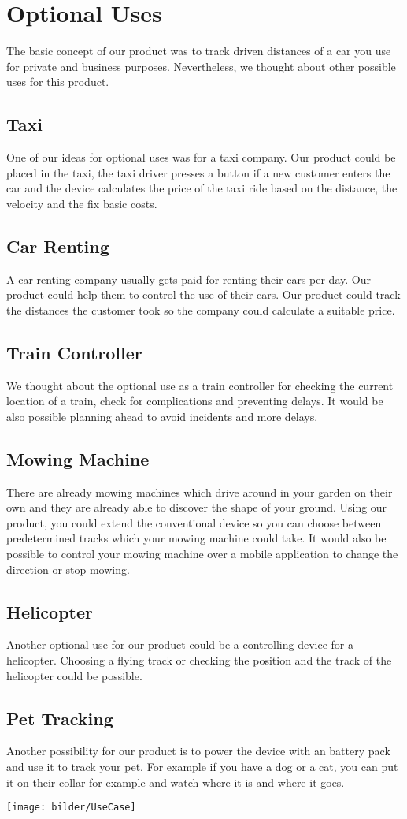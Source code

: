 \chapter{Optional Uses}
The basic concept of our product was to track driven distances of a car you use for private and business purposes. Nevertheless, we thought about other possible uses for this product.
\section{Taxi}
One of our ideas for optional uses was for a taxi company. Our product could be placed in the taxi, the taxi driver presses a button if a new customer enters the car and the device calculates the price of the taxi ride based on the distance, the velocity and the fix basic costs. 
\section{Car Renting}
A car renting company usually gets paid for renting their cars per day. Our product could help them to control the use of their cars. Our product could track the distances the customer took so the company could calculate a suitable price. 
\section{Train Controller}
We thought about the optional use as a train controller for checking the current location of a train, check for complications and preventing delays. It would be also possible planning ahead to avoid incidents and more delays.
\section{Mowing Machine}
There are already mowing machines which drive around in your garden on their own and they are already able to discover the shape of your ground. Using our product, you could extend the conventional device so you can choose between predetermined tracks which your mowing machine could take. It would also be possible to control your mowing machine over a mobile application to change the direction or stop mowing.
\section{Helicopter}
Another optional use for our product could be a controlling device for a helicopter. Choosing a flying track or checking the position and the track of the helicopter could be possible.
\section{Pet Tracking}
Another possibility for our product is to power the device with an battery pack and use it to track your pet. For example if you have a dog or a cat, you can put it on their collar for example and watch where it is and where it goes.
\begin{center}
\texttt{[image: bilder/UseCase]}
\end{center}
